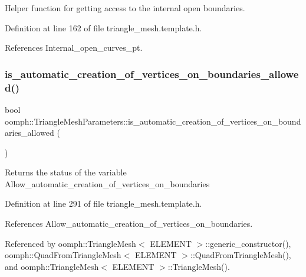 Helper function for getting access to the internal open boundaries. 



Definition at line 162 of file triangle\+\_\+mesh.\+template.\+h.



References Internal\+\_\+open\+\_\+curves\+\_\+pt.

\mbox{\label{classoomph_1_1TriangleMeshParameters_a1c4b2e2d3d8831d46e42bd432fdcae32}} 
\subsubsection{\texorpdfstring{is\+\_\+automatic\+\_\+creation\+\_\+of\+\_\+vertices\+\_\+on\+\_\+boundaries\+\_\+allowed()}{is\_automatic\_creation\_of\_vertices\_on\_boundaries\_allowed()}}
{\footnotesize\ttfamily bool oomph\+::\+Triangle\+Mesh\+Parameters\+::is\+\_\+automatic\+\_\+creation\+\_\+of\+\_\+vertices\+\_\+on\+\_\+boundaries\+\_\+allowed (\begin{DoxyParamCaption}{ }\end{DoxyParamCaption})\hspace{0.3cm}{\ttfamily [inline]}}

Returns the status of the variable Allow\+\_\+automatic\+\_\+creation\+\_\+of\+\_\+vertices\+\_\+on\+\_\+boundaries 

Definition at line 291 of file triangle\+\_\+mesh.\+template.\+h.



References Allow\+\_\+automatic\+\_\+creation\+\_\+of\+\_\+vertices\+\_\+on\+\_\+boundaries.



Referenced by oomph\+::\+Triangle\+Mesh$<$ E\+L\+E\+M\+E\+N\+T $>$\+::generic\+\_\+constructor(), oomph\+::\+Quad\+From\+Triangle\+Mesh$<$ E\+L\+E\+M\+E\+N\+T $>$\+::\+Quad\+From\+Triangle\+Mesh(), and oomph\+::\+Triangle\+Mesh$<$ E\+L\+E\+M\+E\+N\+T $>$\+::\+Triangle\+Mesh().

